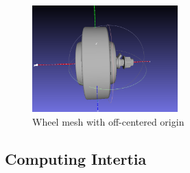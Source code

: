 \documentclass[11pt]{article}
\begin{document}
\begin{itemize}
{       \begin{figure}[!htb]
        \centering
        \includegraphics[width=0.5\textwidth]{images/offcenteredwheel}
        \caption{Wheel mesh with off-centered origin}
       \end{figure}
       }
\end{itemize}
\subsection{Computing Intertia }
\end{document}
